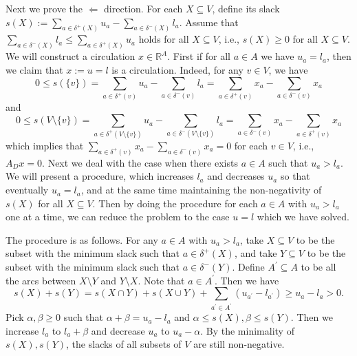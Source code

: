 \documentclass[11pt]{article}
\renewcommand{\leq}{\leqslant}
\renewcommand{\geq}{\geqslant}
\begin{document}
\begin{enumerate}[1)]
\begin{solution}
Next we prove the $\Leftarrow$ direction. For each $X\subseteq V$, define its slack $s(X):= \sum_{a \in \delta^+(X)} u_a - \sum_{a \in \delta^-(X)} l_a$.
Assume that $ \displaystyle\sum_{a \in \delta^-(X)} l_a \leq \displaystyle\sum_{a \in \delta^+(X)} u_a$ holds for all $X\subseteq V$, i.e., $s(X) \geq 0$ for all $X\subseteq V$. We will construct a circulation $x \in \mathbb{R}^A$. 
First if for all $a\in A$ we have $u_a=l_a$, then we claim that $x:=u=l$ is a circulation. Indeed, for any $v\in V$, we have 
\[
0\leq s(\{v\}) = \sum_{a \in \delta^+(v)} u_a - \sum_{a \in \delta^-(v)} l_a = \sum_{a \in \delta^+(v)} x_a - \sum_{a \in \delta^-(v)} x_a
\]
and
\[
0\leq s(V\setminus \{v\}) = \sum_{a \in \delta^+(V\setminus \{v\})} u_a - \sum_{a \in \delta^-(V\setminus \{v\})} l_a = \sum_{a \in \delta^-(v)} x_a - \sum_{a \in \delta^+(v)} x_a
\]
which implies that $\sum_{a \in \delta^+(v)} x_a - \sum_{a \in \delta^-(v)} x_a = 0$ for each $v\in V$, i.e., $A_Dx=0$.
Next we deal with the case when there exists $a\in A$ such that $u_a>l_a$. We will present a procedure, which increases $l_a$ and decreases $u_a$ so that eventually $u_a=l_a$, and at the same time maintaining the non-negativity of $s(X)$ for all $X\subseteq V$. Then by doing the procedure for each $a\in A$ with $u_a>l_a$ one at a time, we can reduce the problem to the case $u=l$ which we have solved.

The procedure is as follows. For any $a\in A$ with $u_a>l_a$, take $X\subseteq V$ to be the subset with the minimum slack such that $a\in \delta^{+}(X)$, and take $Y \subseteq V$ to be the subset with the minimum slack such that $a\in\delta^-(Y)$. 
Define $A^\prime \subseteq A$ to be all the arcs between $X\setminus Y$ and $Y\setminus X$. Note that $a \in A^\prime$. Then we have
\[
s(X) + s(Y) = s(X\cap Y) + s(X\cup Y) + \sum_{a^\prime\in A^\prime} (u_{a^\prime}-l_{a^\prime}) \geq u_a - l_a>0.
\]
Pick $\alpha, \beta\geq 0$ such that $\alpha+\beta = u_a-l_a$ and $\alpha\leq s(X), \beta\leq s(Y)$. Then we increase $l_a$ to $l_a+\beta$ and decrease $u_a$ to $u_a - \alpha$. By the minimality of $s(X), s(Y)$, the slacks of all subsets of $V$ are still non-negative.
\end{solution}

\end{enumerate}




  
\end{document}
